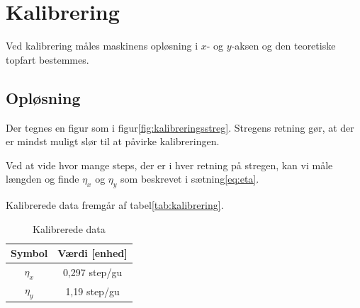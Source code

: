 \chapter{Kalibrering}


Ved kalibrering måles maskinens opløsning i $x$- og $y$-aksen og den
teoretiske topfart bestemmes.

\section{Opløsning}

Der tegnes en figur som i figur\vref{fig:kalibreringsstreg}. Stregens
retning gør, at der er mindst muligt slør til at påvirke
kalibreringen.


Ved at vide hvor mange steps, der er i hver retning på stregen, kan vi
måle længden og finde $\eta_x$ og $\eta_y$ som beskrevet i
sætning\vref{eq:eta}.

Kalibrerede data fremgår af tabel\vref{tab:kalibrering}.

\begin{table}[htbp]
  \centering
  \caption{Kalibrerede data}
  \label{tab:kalibrering}
  \begin{tabular}{cc}
    \toprule
    \bfseries Symbol & \bfseries Værdi [enhed] \\
    \midrule
    $\eta_x$ & 0,297 step/gu \\
    $\eta_y$ & 1,19 step/gu \\
    \bottomrule
  \end{tabular}
\end{table}


